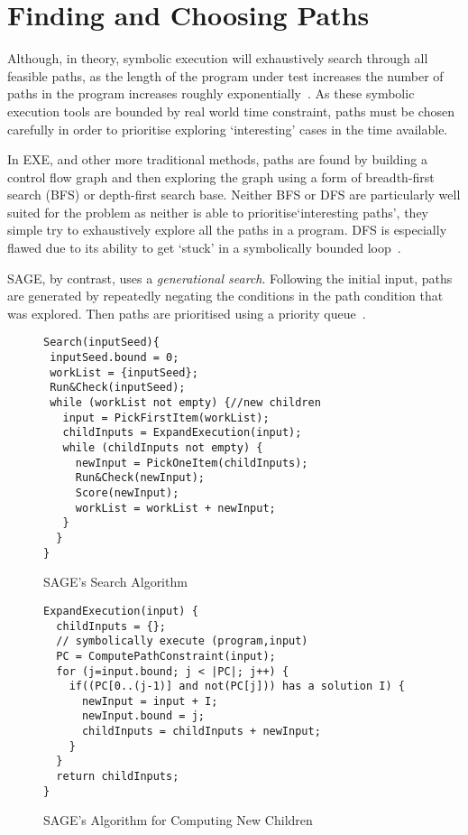 \documentclass[]{final_report}
\begin{document}
\section{Finding and Choosing Paths}

Although, in theory, symbolic execution will exhaustively search through all feasible paths, as the length of the program under test increases the number of paths in the program increases roughly exponentially~\cite{cadar2013symbolic}. As these symbolic execution tools are bounded by real world time constraint, paths must be chosen carefully in order to prioritise exploring `interesting' cases in the time available.

In EXE, and other more traditional methods, paths are found by building a control flow graph and then exploring the graph using a form of breadth-first search (BFS) or depth-first search base. Neither BFS or DFS are particularly well suited for the problem as neither is able to prioritise`interesting paths', they simple try to exhaustively explore all the paths in a program. DFS is especially flawed due to its ability to get `stuck' in a symbolically bounded loop~\cite{cadar2008exe}. 

SAGE, by contrast, uses a \textit{generational search}. Following the initial input, paths are generated by repeatedly negating the conditions in the path condition that was explored. Then paths are prioritised using a priority queue~\cite{godefroid2005dart}.

\begin{figure}[t]
\begin{lstlisting}
Search(inputSeed){
 inputSeed.bound = 0;
 workList = {inputSeed};
 Run&Check(inputSeed);
 while (workList not empty) {//new children
   input = PickFirstItem(workList);
   childInputs = ExpandExecution(input);
   while (childInputs not empty) {
     newInput = PickOneItem(childInputs);
     Run&Check(newInput);
     Score(newInput);
     workList = workList + newInput;
   }
  }
}
\end{lstlisting}
\caption{\label{fig:sage-search} SAGE's Search Algorithm}
\end{figure}

\begin{figure}[t]
\begin{lstlisting}
ExpandExecution(input) {
  childInputs = {};
  // symbolically execute (program,input)
  PC = ComputePathConstraint(input);
  for (j=input.bound; j < |PC|; j++) {
    if((PC[0..(j-1)] and not(PC[j])) has a solution I) {
      newInput = input + I;
      newInput.bound = j;
      childInputs = childInputs + newInput;
    }
  }
  return childInputs;
}

\end{lstlisting}
\caption{\label{fig:sage-compute-new-children} SAGE's Algorithm for Computing New Children}
\end{figure}
\end{document}
